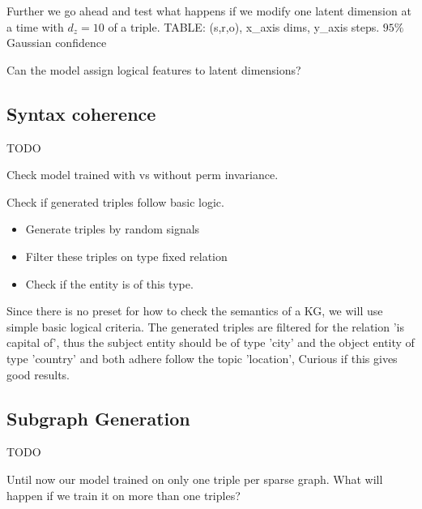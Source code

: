 Further we go ahead and test what happens if we modify one latent dimension at a time with $d_z = 10$ of a triple. TABLE: (s,r,o), x_axis dims, y_axis steps. $95\%$ Gaussian confidence 

Can the model assign logical features to latent dimensions?


\subsection{Syntax coherence}

TODO

Check model trained with vs without perm invariance.

Check if generated triples follow basic logic.
\begin{itemize}
    \item Generate triples by random signals
    \item Filter these triples on type fixed relation
    \item Check if the entity is of this type.
\end{itemize}

Since there is no preset for how to check the semantics of a KG, we will use simple basic logical criteria.
The generated triples are filtered for the relation 'is capital of', thus the subject entity should be of type 'city' and the object entity of type 'country' and both adhere follow the topic 'location',
Curious if this gives good results.


\subsection{Subgraph Generation}

TODO

Until now our model trained on only one triple per sparse graph. What will happen if we train it on more than one triples?
